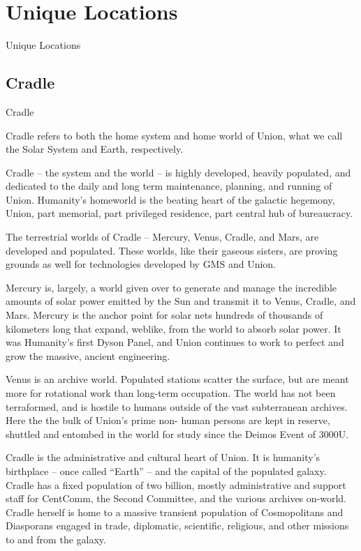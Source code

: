 
\section{Unique Locations}
Unique Locations   
\subsection{Cradle}
Cradle  

                                                                                                                  


Cradle refers to both the home system and home world of Union, what we call the Solar System  
and Earth, respectively. 
 

Cradle -- the system and the world -- is highly developed, heavily populated, and dedicated to  
the daily and long term maintenance, planning, and running of Union. Humanity's homeworld is  
the beating heart of the galactic hegemony, Union, part memorial, part privileged residence, part  
central hub of bureaucracy. 
 

The terrestrial worlds of Cradle -- Mercury, Venus, Cradle, and Mars, are developed and  
populated. These worlds, like their gaseous sisters, are proving grounds as well for technologies  
developed by GMS and Union. 
 

Mercury is, largely, a world given over to generate and manage the incredible amounts of solar  
power emitted by the Sun and transmit it to Venus, Cradle, and Mars. Mercury is the anchor  
point for solar nets hundreds of thousands of kilometers long that expand, weblike, from the  
world to absorb solar power. It was Humanity’s first Dyson Panel, and Union continues to work to  
perfect and grow the massive, ancient engineering. 
 

Venus is an archive world. Populated stations scatter the surface, but are meant more for  
rotational work than long-term occupation. The world has not been terraformed, and is hostile to  
humans outside of the vast subterranean archives. Here the the bulk of Union’s prime non- 
human persons are kept in reserve, shuttled and entombed in the world for study since the  
Deimos Event of 3000U.  
 

Cradle is the administrative and cultural heart of Union. It is humanity’s birthplace -- once called  
“Earth” -- and the capital of the populated galaxy. Cradle has a fixed population of two billion,  
mostly administrative and support staff for CentComm, the Second Committee,  and the various  
archives on-world. Cradle herself is home to a massive transient population of Cosmopolitans  
and Diasporans engaged in trade, diplomatic, scientific, religious, and other missions to and from  
the galaxy.
 


